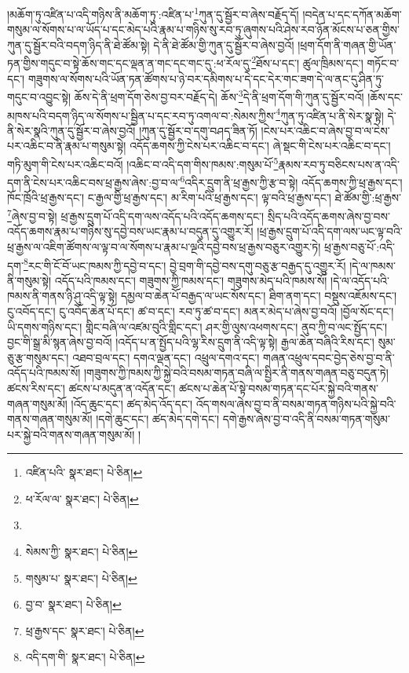 །མཆོག་ཏུ་འཛིན་པ་འདི་གཉིས་ནི་མཆོག་ཏུ་:འཛིན་པ་\footnote{འཛིན་པའི་  སྣར་ཐང་།  པེ་ཅིན། }ཀུན་དུ་སྦྱོར་བ་ཞེས་བརྗོད་དོ། །བདེན་པ་དང་དཀོན་མཆོག་གསུམ་ལ་སོགས་པ་ལ་ཡོད་པ་དང་མེད་པའི་རྣམ་པ་གཉིས་སུ་རབ་ཏུ་ཞུགས་པའི་ཤེས་རབ་ཉོན་མོངས་པ་ཅན་གྱིས་ཀུན་དུ་སྦྱོར་བའི་བདག་ཉིད་ནི་ཐེ་ཚོམ་སྟེ། དེ་ནི་ཐེ་ཚོམ་གྱི་ཀུན་དུ་སྦྱོར་བ་ཞེས་བྱའོ། །ཕྲག་དོག་ནི་གཞན་གྱི་ཡོན་ཏན་གྱིས་གདུང་བ་སྟེ་ཆོས་གང་དང་ལྡན་ན་གང་དང་གང་དུ་:ཕ་རོལ་དུ་\footnote{ཕ་རོལ་ལ་  སྣར་ཐང་།  པེ་ཅིན། }ཐོས་པ་དང་། ཚུལ་ཁྲིམས་དང་། གཏོང་བ་དང་། གཟུགས་ལ་སོགས་པའི་ཡོན་ཏན་ཚོགས་པ་ཉེ་བར་དམིགས་པ་དེ་དང་དེར་གང་ཟག་དེ་ལ་ནང་དུ་ཤིན་ཏུ་གདུང་བ་འབྱུང་སྟེ། ཆོས་དེ་ནི་ཕྲག་དོག་ཅེས་བྱ་བར་བརྗོད་དེ། ཆོས་\footnote{}དེ་ནི་ཕྲག་དོག་གི་ཀུན་དུ་སྦྱོར་བའོ། །ཆོས་དང་མཁས་པའི་བདག་ཉིད་ལ་སོགས་པ་སྦྱིན་པ་དང་རབ་ཏུ་འགལ་བ་:སེམས་ཀྱིས་\footnote{སེམས་ཀྱི་  སྣར་ཐང་།  པེ་ཅིན། }ཀུན་ཏུ་འཛིན་པ་ནི་སེར་སྣ་སྟེ། དེ་ནི་སེར་སྣའི་ཀུན་དུ་སྦྱོར་བ་ཞེས་བྱའོ། །ཀུན་དུ་སྦྱོར་བ་དགུ་བཤད་ཟིན་ཏོ། །ངེས་པར་འཆིང་བ་ཞེས་བྱ་བ་ལ་ངེས་པར་འཆིང་བ་ནི་རྣམ་པ་གསུམ་སྟེ། འདོད་ཆགས་ཀྱི་ངེས་པར་འཆིང་བ་དང་། ཞེ་སྡང་གི་ངེས་པར་འཆིང་བ་དང་། གཏི་མུག་གི་ངེས་པར་འཆིང་བའོ། །འཆིང་བ་འདི་དག་གིས་ཁམས་:གསུམ་པོ་\footnote{གསུམ་པ་  སྣར་ཐང་།  པེ་ཅིན། }རྣམས་རབ་ཏུ་བཅིངས་པས་ན་འདི་དག་ནི་ངེས་པར་འཆིང་བས་ཕྲ་རྒྱས་ཞེས་:བྱ་བ་ལ་\footnote{བྱ་བ་  སྣར་ཐང་།  པེ་ཅིན། }འདིར་དྲུག་ནི་ཕྲ་རྒྱས་ཀྱི་རྩ་བ་སྟེ། འདོད་ཆགས་ཀྱི་ཕྲ་རྒྱས་དང་། ཁོང་ཁྲོའི་ཕྲ་རྒྱས་དང་། ང་རྒྱལ་གྱི་ཕྲ་རྒྱས་དང་། མ་རིག་པའི་ཕྲ་རྒྱས་དང་། ལྟ་བའི་ཕྲ་རྒྱས་དང་། ཐེ་ཚོམ་གྱི་:ཕྲ་རྒྱས་\footnote{ཕྲ་རྒྱས་དང་  སྣར་ཐང་།  པེ་ཅིན། }ཞེས་བྱ་བ་སྟེ། ཕྲ་རྒྱས་དྲུག་པོ་འདི་དག་ལས་འདོད་པའི་འདོད་ཆགས་དང་། སྲིད་པའི་འདོད་ཆགས་ཞེས་བྱ་བས་འདོད་ཆགས་རྣམ་པ་གཉིས་སུ་དབྱེ་བས་ཡང་རྣམ་པ་བདུན་དུ་འགྱུར་རོ། །ཕྲ་རྒྱས་དྲུག་པོ་འདི་དག་ལས་ཡང་ལྟ་བའི་ཕྲ་རྒྱས་ལ་འཇིག་ཚོགས་ལ་ལྟ་བ་ལ་སོགས་པ་རྣམ་པ་ལྔའི་དབྱེ་བས་ཕྲ་རྒྱས་བཅུར་འགྱུར་ཏེ། ཕྲ་རྒྱས་བཅུ་པོ་:འདི་དག་\footnote{འདི་དག་གི་  སྣར་ཐང་།  པེ་ཅིན། }རང་གི་ངོ་བོ་ཡང་ཁམས་ཀྱི་དབྱེ་བ་དང་། བྱེ་བྲག་གི་དབྱེ་བས་དགུ་བཅུ་རྩ་བརྒྱད་དུ་འགྱུར་རོ། །དེ་ལ་ཁམས་ནི་གསུམ་སྟེ། འདོད་པའི་ཁམས་དང་། གཟུགས་ཀྱི་ཁམས་དང་། གཟུགས་མེད་པའི་ཁམས་སོ། །དེ་ལ་འདོད་པའི་ཁམས་ནི་གནས་ཉི་ཤུ་འདི་ལྟ་སྟེ། དམྱལ་བ་ཆེན་པོ་བརྒྱད་ལ་ཡང་སོས་དང་། ཐིག་ནག་དང་། བསྡུས་འཇོམས་དང་། ངུ་འབོད་དང་། ངུ་འབོད་ཆེན་པོ་དང་། ཚ་བ་དང་། རབ་ཏུ་ཚ་བ་དང་། མནར་མེད་པ་ཞེས་བྱ་བའོ། །བྱོལ་སོང་དང་། ཡི་དགས་གཉིས་དང་། གླིང་བཞི་ལ་འཛམ་བུའི་གླིང་དང་། ཤར་གྱི་ལུས་འཕགས་དང་། ནུབ་ཀྱི་བ་ལང་སྤྱོད་དང་། བྱང་གི་སྒྲ་མི་སྙན་ཞེས་བྱ་བའོ། །འདོད་པ་ན་སྤྱོད་པའི་ལྷ་རིས་དྲུག་ནི་འདི་ལྟ་སྟེ། རྒྱལ་ཆེན་བཞིའི་རིས་དང་། སུམ་ཅུ་རྩ་གསུམ་དང་། འཐབ་བྲལ་དང་། དགའ་ལྡན་དང་། འཕྲུལ་དགའ་དང་། གཞན་འཕྲུལ་དབང་བྱེད་ཅེས་བྱ་བ་ནི་འདོད་པའི་ཁམས་སོ། །གཟུགས་ཀྱི་ཁམས་ཀྱི་སྐྱེ་བའི་བསམ་གཏན་བཞི་ལ་སྤྱིར་ནི་གནས་གཞན་བཅུ་བདུན་ཏེ། ཚངས་རིས་དང་། ཚངས་པ་མདུན་ན་འདོན་དང་། ཚངས་པ་ཆེན་པོ་སྟེ་བསམ་གཏན་དང་པོར་སྐྱེ་བའི་གནས་གཞན་གསུམ་མོ། །འོད་ཆུང་དང་། ཚད་མེད་འོད་དང་། འོད་གསལ་ཞེས་བྱ་བ་ནི་བསམ་གཏན་གཉིས་པའི་སྐྱེ་བའི་གནས་གཞན་གསུམ་མོ། །དགེ་ཆུང་དང་། ཚད་མེད་དགེ་དང་། དགེ་རྒྱས་ཞེས་བྱ་བ་འདི་ནི་བསམ་གཏན་གསུམ་པར་སྐྱེ་བའི་གནས་གཞན་གསུམ་མོ། །
